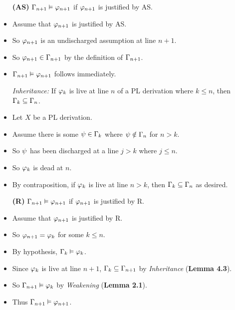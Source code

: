 \documentclass[a4paper, 11pt]{article} %
\begin{document}
\begin{itemize}
  \item[\bf (AS)] $\Gamma_{n+1} \vDash \varphi_{n+1}$ if $\varphi_{n+1}$ is justified by AS. 
    \item Assume that $\varphi_{n+1}$ is justified by AS.
    \item So $\varphi_{n+1}$ is an undischarged assumption at line $n+1$.
    \item So $\varphi_{n+1}\in\Gamma_{n+1}$ by the definition of $\Gamma_{n+1}$.
    \item $\Gamma_{n+1} \vDash \varphi_{n+1}$ follows immediately.
  \item[\it Inheritance:] If $\varphi_k$ is live at line $n$ of a PL derivation where $k\leq n$, then $\Gamma_k\subseteq \Gamma_n$.
    \item Let $X$ be a PL derivation.
    \item Assume there is some $\psi \in \Gamma_k$ where $\psi \notin \Gamma_n$ for $n > k$.
    \item So $\psi$ has been discharged at a line $j > k$ where $j \leq n$.
    \item So $\varphi_k$ is dead at $n$.
    \item By contraposition, if $\varphi_k$ is live at line $n > k$, then $\Gamma_k\subseteq \Gamma_n$ as desired.
  \item[\bf (R)] $\Gamma_{n+1} \vDash \varphi_{n+1}$ if $\varphi_{n+1}$ is justified by R. 
    \item Assume that $\varphi_{n+1}$ is justified by R.
    \item So $\varphi_{n+1}=\varphi_{k}$ for some $k\leq n$.
    \item By hypothesis, $\Gamma_k \vDash \varphi_k$.
    \item Since $\varphi_k$ is live at line $n+1$, $\Gamma_k\subseteq \Gamma_{n+1}$ by \textit{Inheritance} (\textbf{Lemma 4.3}).
    \item So $\Gamma_{n+1} \vDash \varphi_{k}$ by \textit{Weakening} (\textbf{Lemma 2.1}).
    \item Thus $\Gamma_{n+1} \vDash \varphi_{n+1}$.
\end{itemize}

  
  
\end{document}
